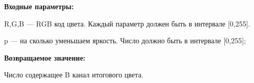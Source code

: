 \textbf{Входные параметры:}  

R,G,B --- RGB код цвета. Каждый параметр должен быть в интервале [0,255].

p --- на сколько уменьшаем яркость. Число должно быть в интервале [0,255];

\textbf{Возвращаемое значение:}

Число содержащее B канал итогового цвета.